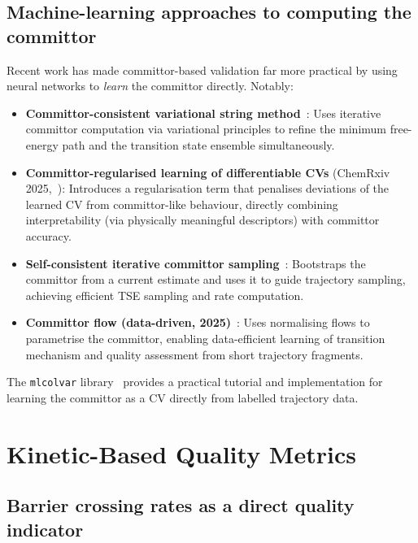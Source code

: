 \documentclass[12pt, a4paper]{article}
\begin{document}
\subsection{Machine-learning approaches to computing the committor}

Recent work has made committor-based validation far more practical by 
using neural networks to \emph{learn} the committor directly.  Notably:

\begin{itemize}[noitemsep]
  \item \textbf{Committor-consistent variational string method}~\citep{Li2024CCVSM}: 
        Uses iterative committor computation via variational principles to 
        refine the minimum free-energy path and the transition state 
        ensemble simultaneously.
  \item \textbf{Committor-regularised learning of differentiable CVs} 
        (ChemRxiv 2025,~\citealt{Bonati2025CommittorReg}): Introduces a 
        regularisation term that penalises deviations of the learned CV 
        from committor-like behaviour, directly combining 
        interpretability (via physically meaningful descriptors) with 
        committor accuracy.
  \item \textbf{Self-consistent iterative committor sampling}~\citep{Kang2024}: 
        Bootstraps the committor from a current estimate and uses it to 
        guide trajectory sampling, achieving efficient TSE sampling and 
        rate computation.
  \item \textbf{Committor flow (data-driven, 2025)}~\citep{CommittorFlow2025}: 
        Uses normalising flows to parametrise the committor, enabling 
        data-efficient learning of transition mechanism and quality 
        assessment from short trajectory fragments.
\end{itemize}

The \texttt{mlcolvar} library~\citep{Bonati2023mlcolvar} provides a 
practical tutorial and implementation for learning the committor as a 
CV directly from labelled trajectory data.

\section{Kinetic-Based Quality Metrics}
\label{sec:kinetic}

\subsection{Barrier crossing rates as a direct quality indicator}
\end{document}

